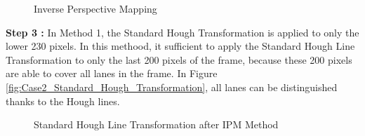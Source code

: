  
\begin{figure}[H]
  \centering
  \hfill
  \caption{Inverse Perspective Mapping}
\end{figure} 


\textbf{Step 3 : }In Method 1, the Standard Hough Transformation is applied to only the lower 230 pixels. In this methood, it sufficient to apply the Standard Hough Line Transformation to only the last 200 pixels of the frame, because these 200 pixels are able to cover all lanes in the frame. In Figure \ref{fig:Case2_Standard_Hough_Transformation}, all lanes can be distinguished thanks to the Hough lines. 


\begin{figure}[H]
  \centering
  \caption{Standard Hough Line Transformation after IPM Method}
\end{figure} 



